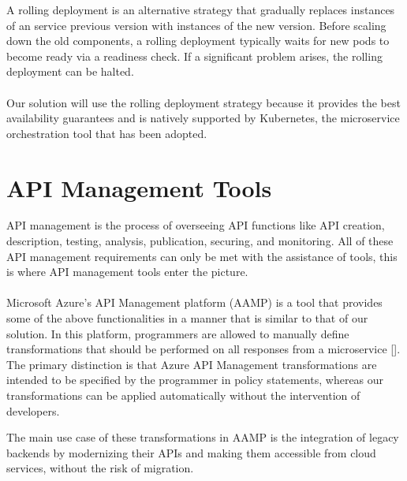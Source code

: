 A rolling deployment is an alternative strategy that gradually replaces instances of an service previous version with instances of the new version.
Before scaling down the old components, a rolling deployment typically waits for new pods to become ready via a readiness check.
If a significant problem arises, the rolling deployment can be halted.

\paragraph{}

Our solution will use the rolling deployment strategy because it provides the best availability guarantees
and is natively supported by Kubernetes, the microservice orchestration tool that has been adopted.

\section{API Management Tools} %
\label{sec:api_management_tools}

API management is the process of overseeing API functions like API creation, description, testing, analysis, publication, securing, and monitoring.
All of these API management requirements can only be met with the assistance of tools, this is where API management tools enter the picture.

\paragraph{}

Microsoft Azure's API Management platform (AAMP) is a tool that provides some of the above functionalities in a manner that is similar to that of our solution.
In this platform, programmers are allowed to manually define transformations that should be performed on all responses from a microservice [].
The primary distinction is that Azure API Management transformations are intended to be specified by the programmer in policy statements,
whereas our transformations can be applied automatically without the intervention of developers.

The main use case of these transformations in AAMP is the integration of legacy backends by modernizing their APIs and making them accessible from cloud services, without the risk of migration.

\paragraph{}

